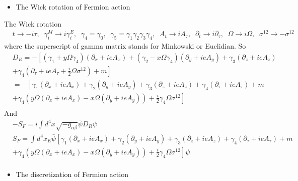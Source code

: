 \begin{itemize}
  \item The Wick rotation of Fermion action
\end{itemize}

The Wick rotation
\begin{equation}
\begin{split}
&t\to -i\tau,\;\;\gamma _i^{M}\to i\gamma _i^{E},\;\;\gamma _4=\gamma _0,\;\;\gamma _5=\gamma _1\gamma _2\gamma _3\gamma _4,\;\;A_t\to i A_{\tau},\;\;\partial _t\to i\partial _{\tau},\;\;\Omega \to i\Omega,\;\;\sigma ^{12}\to -\sigma ^{12}
\end{split}
\end{equation}
where the superscript of gamma matrix stands for Minkowski or Euclidian. So
\begin{equation}
\begin{split}
&D_R=-\left[(\gamma _1+y\Omega \gamma_4) (\partial _x+ieA_x)+(\gamma _2-x\Omega \gamma_4) (\partial _y+ieA_y)+\gamma _3 (\partial _z+ieA_z)\right.\\
&\left.+\gamma _4 (\partial _{\tau}+ieA_{\tau}+\frac{i}{2}\Omega \sigma ^{12})+m\right]\\
&=-\left[\gamma _1 (\partial _x+ieA_x)+\gamma _2(\partial _y+ieA_y)+\gamma _3 (\partial _z+ieA_z)+\gamma _4 (\partial _{\tau}+ieA_{\tau})+m\right.\\
&\left.+\gamma _4 \left(y\Omega(\partial _x+ieA_x)-x\Omega(\partial _y+ieA_y)\right)+\frac{i}{2}\gamma _4\Omega \sigma ^{12}\right]\\
\end{split}
\end{equation}
And
\begin{equation}
\begin{split}
&-S_F=i\int d^4 x \sqrt{-g_{\alpha \beta}}\bar{\psi } D_R \psi\\
&S_F=\int d^4 x_E \bar{\psi } \left[\gamma _1 (\partial _x+ieA_x)+\gamma _2(\partial _y+ieA_y)+\gamma _3 (\partial _z+ieA_z)+\gamma _4 (\partial _{\tau}+ieA_{\tau})+m\right.\\
&\left.+\gamma _4 \left(y\Omega(\partial _x+ieA_x)-x\Omega(\partial _y+ieA_y)\right)+\frac{i}{2}\gamma _4\Omega \sigma ^{12}\right] \psi\\
\end{split}
\end{equation}

\begin{itemize}
  \item The discretization of Fermion action
\end{itemize}

